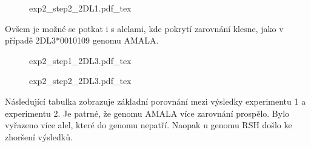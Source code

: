 \documentclass[czech,DP]{thesiskiv}
\numberwithin{equation}{section}
\begin{document}
\begin{figure}[H]
	\centering
    \def\svgwidth{\columnwidth}
    {exp2_step2_2DL1.pdf_tex} 
\end{figure}

\noindent
Ovšem je možné se potkat i s alelami, kde pokrytí zarovnání klesne, jako v případě 2DL3*0010109 genomu AMALA.

\begin{figure}[H]
	\centering
    \def\svgwidth{\columnwidth}
    {exp2_step1_2DL3.pdf_tex} 
\end{figure}

\begin{figure}[H]
	\centering
    \def\svgwidth{\columnwidth}
    {exp2_step2_2DL3.pdf_tex} 
\end{figure}

\noindent
Následující tabulka zobrazuje základní porovnání mezi výsledky experimentu 1 a experimentu 2. Je patrné, že genomu AMALA více zarovnání prospělo. Bylo vyřazeno více alel, které do genomu nepatří. Naopak u genomu RSH došlo ke zhoršení výsledků.
\end{document}
